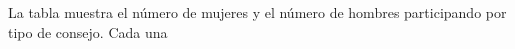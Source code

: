 La tabla muestra el número de mujeres y el número de hombres participando por tipo de consejo. Cada una